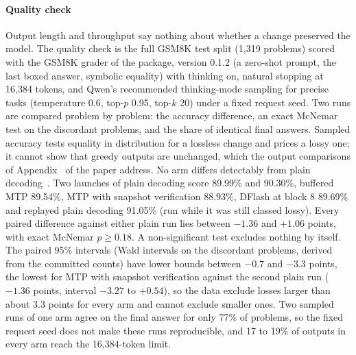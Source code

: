 \paragraph{Quality check}\label{sec:serving-quality} Output length and throughput say nothing about whether a change preserved the model. The quality check is the full GSM8K test split (1,319 problems) scored with the GSM8K grader of the  package, version 0.1.2 (a zero-shot prompt, the last boxed answer, symbolic equality) with thinking on, natural stopping at 16,384 tokens, and Qwen's recommended thinking-mode sampling for precise tasks (temperature 0.6, top-$p$ 0.95, top-$k$ 20) under a fixed request seed. Two runs are compared problem by problem: the accuracy difference, an exact McNemar test on the discordant problems, and the share of identical final answers. Sampled accuracy tests equality in distribution for a lossless change and prices a lossy one; it cannot show that greedy outputs are unchanged, which the output comparisons of Appendix~ of the paper address. No arm differs detectably from plain decoding~. Two launches of plain decoding score 89.99\% and 90.30\%, buffered MTP 89.54\%, MTP with snapshot verification 88.93\%, DFlash at block 8 89.69\% and replayed plain decoding 91.05\% (run while it was still classed lossy). Every paired difference against either plain run lies between $-1.36$ and $+1.06$ points, with exact McNemar $p\ge0.18$. A non-significant test excludes nothing by itself. The paired 95\% intervals (Wald intervals on the discordant problems, derived from the committed counts) have lower bounds between $-0.7$ and $-3.3$ points, the lowest for MTP with snapshot verification against the second plain run ($-1.36$ points, interval $-3.27$ to $+0.54$), so the data exclude losses larger than about 3.3 points for every arm and cannot exclude smaller ones. Two sampled runs of one arm agree on the final answer for only 77\% of problems, so the fixed request seed does not make these runs reproducible, and 17 to 19\% of outputs in every arm reach the 16,384-token limit.

